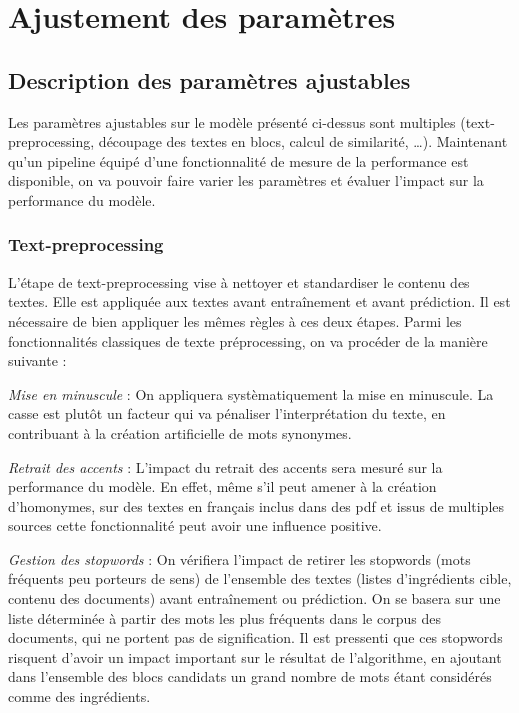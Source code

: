     \chapter{Ajustement des paramètres}
    \label{model_tuning}

        \section{Description des paramètres ajustables}

        Les paramètres ajustables sur le modèle présenté ci-dessus sont multiples (text-preprocessing, découpage des textes en blocs, calcul de similarité, \dots).
        Maintenant qu'un pipeline équipé d'une fonctionnalité de mesure de la performance est disponible, on va pouvoir faire varier les paramètres et évaluer l'impact sur la performance du modèle.

        \subsection{Text-preprocessing}

        L'étape de text-preprocessing vise à nettoyer et standardiser le contenu des textes.
        Elle est appliquée aux textes avant entraînement et avant prédiction.
        Il est nécessaire de bien appliquer les mêmes règles à ces deux étapes.
        Parmi les fonctionnalités classiques de texte préprocessing, on va procéder de la manière suivante : 

        \emph{Mise en minuscule} : 
        On appliquera systèmatiquement la mise en minuscule. 
        La casse est plutôt un facteur qui va pénaliser l'interprétation du texte, en contribuant à la création artificielle de mots synonymes.

        \emph{Retrait des accents} : 
        L'impact du retrait des accents sera mesuré sur la performance du modèle.
        En effet, même s'il peut amener à la création d'homonymes, sur des textes en français inclus dans des pdf et issus de multiples sources cette fonctionnalité peut avoir une influence positive.

        \emph{Gestion des stopwords} : 
        On vérifiera l'impact de retirer les stopwords (mots fréquents peu porteurs de sens) de l'ensemble des textes (listes d'ingrédients cible, contenu des documents) avant entraînement ou prédiction.
        On se basera sur une liste déterminée à partir des mots les plus fréquents dans le corpus des documents, qui ne portent pas de signification.
        Il est pressenti que ces stopwords risquent d'avoir un impact important sur le résultat de l'algorithme, en ajoutant dans l'ensemble des blocs candidats un grand nombre de mots étant considérés comme des ingrédients.

